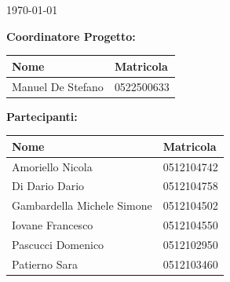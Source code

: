 \begin{titlepage}
		
		\vfill\vfill\vfill %
		
		{\large\today} %
		
	
		
		
		\vfill %
		
	\end{titlepage}
	
	
	\pagestyle{fancy}
	\renewcommand{\headrulewidth}{0pt}
	
	
	\textbf{Coordinatore Progetto:}
	\begin{table}[h]
		\centering
		\begin{tabularx}{0.9\textwidth}{|X|X|}
			\hline
			\textbf{Nome}     & \textbf{Matricola} \\ \hline
			Manuel De Stefano &  0522500633\\ \hline
		\end{tabularx}
	\end{table}

	\vspace{0.5cm}
	
	\textbf{Partecipanti:}
	\begin{table}[h]
		\centering
		\begin{tabularx}{0.9\textwidth}{|X|X|}
			\hline
			\textbf{Nome}     & \textbf{Matricola} \\ \hline
			Amoriello Nicola &  0512104742\\ \hline
			Di Dario Dario &  0512104758\\ \hline
			Gambardella Michele Simone &  0512104502\\ \hline
			Iovane Francesco &  0512104550\\ \hline
			Pascucci Domenico &  0512102950\\ \hline
			Patierno Sara &  0512103460\\ \hline
		\end{tabularx}
	\end{table}

